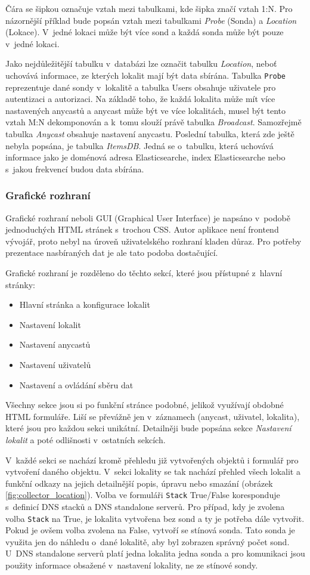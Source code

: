 \documentclass[thesis=M,czech]{src/FITthesis}[2019/12/23]
\begin{document}
Čára se šipkou označuje vztah mezi tabulkami, kde šipka značí vztah 1:N. Pro názornější příklad bude popsán vztah mezi tabulkami \textit{Probe} (Sonda) a \textit{Location} (Lokace). V~jedné lokaci může být více sond a každá sonda může být pouze v~jedné lokaci. 

Jako nejdůležitější tabulku v~databázi lze označit tabulku \textit{Location}, neboť uchovává informace, ze kterých lokalit mají být data sbírána. Tabulka \texttt{Probe} reprezentuje dané sondy v~lokalitě a tabulka Users obsahuje uživatele pro autentizaci a autorizaci. Na základě toho, že každá lokalita může mít více nastavených anycastů a anycast může být ve více lokalitách, musel být tento vztah M:N dekomponován a k~tomu slouží právě tabulka \textit{Broadcast}. Samozřejmě tabulka \textit{Anycast} obsahuje nastavení anycastu. Poslední tabulka, která zde ještě nebyla popsána, je tabulka \textit{ItemsDB}. Jedná se o~tabulku, která uchovává informace jako je doménová adresa Elasticsearche, index Elasticsearche nebo s~jakou frekvencí budou data sbírána. 

\subsubsection{Grafické rozhraní}
Grafické rozhraní neboli GUI (Graphical User Interface) je napsáno v~podobě jednoduchých HTML stránek s~trochou CSS. Autor aplikace není frontend vývojář, proto nebyl na úroveň uživatelského rozhraní kladen důraz. Pro potřeby prezentace nasbíraných dat je ale tato podoba dostačující. 

Grafické rozhraní je rozděleno do těchto sekcí, které jsou přístupné z~hlavní stránky:
\begin{itemize}
	\item Hlavní stránka a konfigurace lokalit
	\item Nastavení lokalit 
	\item Nastavení anycastů
	\item Nastavení uživatelů
	\item Nastavení a ovládání sběru dat
\end{itemize}

Všechny sekce jsou si po funkční stránce podobné, jelikož využívají obdobné HTML formuláře. Liší se převážně jen v~záznamech (anycast, uživatel, lokalita), které jsou pro každou sekci unikátní. Detailněji bude popsána sekce \textit{Nastavení lokalit} a poté odlišnosti v~ostatních sekcích. 

V~každé sekci se nachází kromě přehledu již vytvořených objektů i formulář pro vytvoření daného objektu. V~sekci lokality se tak nachází přehled všech lokalit a funkční odkazy na jejich detailnější popis, úpravu nebo smazání (obrázek \ref{fig:collector_location}). Volba ve formuláři \texttt{Stack} True/False koresponduje s~definicí DNS stacků a DNS standalone serverů. Pro případ, kdy je zvolena volba \texttt{Stack} na True, je lokalita vytvořena bez sond a ty je potřeba dále vytvořit. Pokud je ovšem volba zvolena na False, vytvoří se stínová sonda. Tato sonda je využita jen do náhledu o~dané lokalitě, aby byl zobrazen správný počet sond. U~DNS standalone serverů platí jedna lokalita jedna sonda a pro komunikaci jsou použity informace obsažené v~nastavení lokality, ne ze stínové sondy. 
\end{document}
